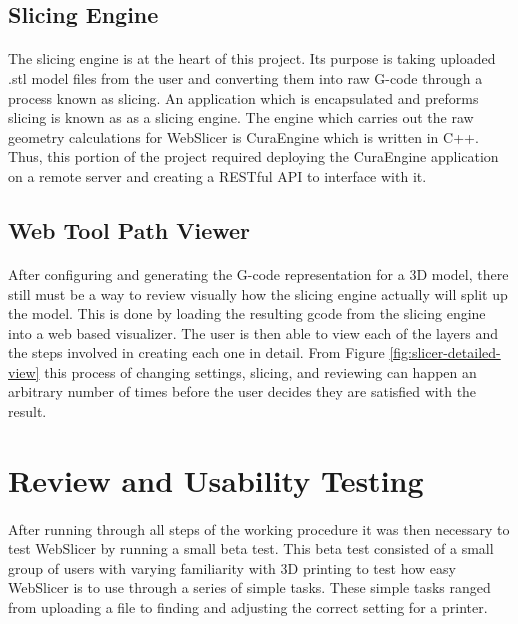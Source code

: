 \subsection{Slicing Engine}
\paragraph{}
The slicing engine is at the heart of this project. 
Its purpose is taking uploaded .stl model files from the user and converting them into raw G-code through a process known as slicing.
An application which is encapsulated and preforms slicing is known as as a slicing engine.
The engine which carries out the raw geometry calculations for WebSlicer is CuraEngine which is written in C++.
Thus, this portion of the project required deploying the CuraEngine application on a remote server and creating a RESTful API to interface with it.

\subsection{Web Tool Path Viewer}
\paragraph{}
After configuring and generating the G-code representation for a 3D model, there still must be a way to review visually how the slicing engine actually will split up the model.
This is done by loading the resulting gcode from the slicing engine into a web based visualizer.
The user is then able to view each of the layers and the steps involved in creating each one in detail.
From Figure \ref{fig:slicer-detailed-view} this process of changing settings, slicing, and reviewing can happen an arbitrary number of times before the user decides they are satisfied with the result.

\section{Review and Usability Testing}
\paragraph{}
After running through all steps of the working procedure it was then necessary to test WebSlicer by running a small beta test. 
This beta test consisted of a small group of users with varying familiarity with 3D printing to test how easy WebSlicer is to use through a series of simple tasks.
These simple tasks ranged from uploading a file to finding and adjusting the correct setting for a printer.
